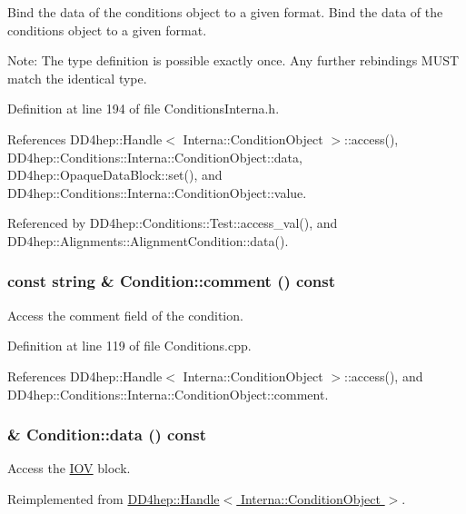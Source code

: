 Bind the data of the conditions object to a given format. Bind the data of the conditions object to a given format.

Note: The type definition is possible exactly once. Any further rebindings MUST match the identical type. 

Definition at line 194 of file ConditionsInterna.h.

References DD4hep::Handle$<$ Interna::ConditionObject $>$::access(), DD4hep::Conditions::Interna::ConditionObject::data, DD4hep::OpaqueDataBlock::set(), and DD4hep::Conditions::Interna::ConditionObject::value.

Referenced by DD4hep::Conditions::Test::access\_\-val(), and DD4hep::Alignments::AlignmentCondition::data().\hypertarget{class_d_d4hep_1_1_conditions_1_1_condition_aba1cf327a9df8f9e694cebc1c3505d4e}{
\subsubsection[{comment}]{\setlength{\rightskip}{0pt plus 5cm}const {\bf string} \& Condition::comment () const}}
\label{class_d_d4hep_1_1_conditions_1_1_condition_aba1cf327a9df8f9e694cebc1c3505d4e}


Access the comment field of the condition. 

Definition at line 119 of file Conditions.cpp.

References DD4hep::Handle$<$ Interna::ConditionObject $>$::access(), and DD4hep::Conditions::Interna::ConditionObject::comment.\hypertarget{class_d_d4hep_1_1_conditions_1_1_condition_a1154252bf161472cd72411149a10702d}{
\subsubsection[{data}]{ \& Condition::data () const}}
\label{class_d_d4hep_1_1_conditions_1_1_condition_a1154252bf161472cd72411149a10702d}


Access the \hyperlink{class_d_d4hep_1_1_i_o_v}{IOV} block. 

Reimplemented from \hyperlink{class_d_d4hep_1_1_handle_a821fe41f46aa5ce97cfb04a6a60e5cd5}{DD4hep::Handle$<$ Interna::ConditionObject $>$}.

